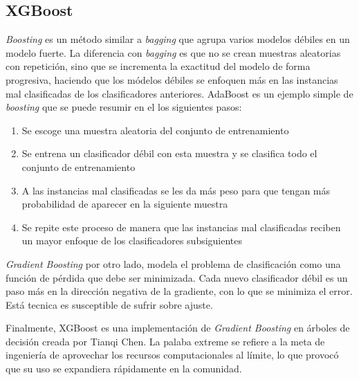 \subsection{XGBoost}

\textit{Boosting} es un método similar a \textit{bagging} que agrupa varios modelos débiles en un modelo fuerte. La diferencia con \textit{bagging} es que no se crean muestras aleatorias con repetición, sino que se incrementa la exactitud del modelo de forma progresiva, haciendo que los módelos débiles se enfoquen más en las instancias mal clasificadas de los clasificadores anteriores. AdaBoost es un ejemplo simple de \textit{boosting} que se puede resumir en el los siguientes pasos:

\begin{enumerate}
	\item Se escoge una muestra aleatoria del conjunto de entrenamiento
	\item Se entrena un clasificador débil con esta muestra y se clasifica todo el conjunto de entrenamiento
	\item A las instancias mal clasificadas se les da más peso para que tengan más probabilidad de aparecer en la siguiente muestra
	\item Se repite este proceso de manera que las instancias mal clasificadas reciben un mayor enfoque de los clasificadores subsiguientes
\end{enumerate}

\textit{Gradient Boosting} por otro lado, modela el problema de clasificación como una función de pérdida que debe ser minimizada. Cada nuevo clasificador débil es un paso más en la dirección negativa de la gradiente, con lo que se minimiza el error. Está tecnica es susceptible de sufrir sobre ajuste.

Finalmente, XGBoost es una implementación de \textit{Gradient Boosting} en árboles de decisión creada por Tianqi Chen. La palaba extreme se refiere a la meta de ingeniería de aprovechar los recursos computacionales al límite, lo que provocó que su uso se expandiera rápidamente en la comunidad.


